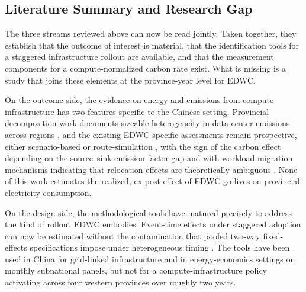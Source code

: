 \documentclass[12pt,a4paper]{article}
\begin{document}
\subsection{Literature Summary and Research Gap}
%
%

The three streams reviewed above can now be read jointly. Taken
together, they establish that the outcome of interest is material,
that the identification tools for a staggered infrastructure rollout
are available, and that the measurement components for a
compute-normalized carbon rate exist. What is missing is a study that
joins these elements at the province-year level for EDWC.

On the outcome side, the evidence on energy and emissions from
compute infrastructure has two features specific to the Chinese
setting. Provincial decomposition work documents sizeable
heterogeneity in data-center emissions across regions
\citep{nietal-2024-co2emissionmitigationpathways}, and the existing
EDWC-specific assessments remain prospective, either scenario-based
\citep{zhangetal-2025-easterndatawestern} or route-simulation
\citep{zhangetal-2025-decarbonizingdatacenters}, with the sign of
the carbon effect depending on the source--sink emission-factor gap
and with workload-migration mechanisms indicating that relocation
effects are theoretically ambiguous
\citep{zhengetal-2020-mitigatingcurtailmentcarbon}. None of this
work estimates the realized, ex post effect of EDWC go-lives on
provincial electricity consumption.

On the design side, the methodological tools have matured precisely
to address the kind of rollout EDWC embodies. Event-time effects
under staggered adoption can now be estimated without the
contamination that pooled two-way fixed-effects specifications
impose under heterogeneous timing
\citep{sunabraham-2021-estimatingdynamictreatmenta,
goodman-bacon-2021-differenceindifferencesvariationtreatmenta}. The
tools have been used in China for grid-linked infrastructure and in
energy-economics settings on monthly subnational panels, but not for
a compute-infrastructure policy activating across four western
provinces over roughly two years.
\end{document}
